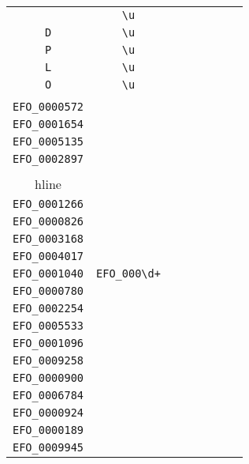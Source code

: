 \begin{longtable}{cccccccc}
\begin{tabular}{ll}
    \verb|U| & \verb|\u|\\
\verb|D| & \verb|\u|\\
\verb|P| & \verb|\u|\\
\verb|L| & \verb|\u|\\
\verb|O| & \verb|\u|
\end{tabular}
\\\midrule 
\begin{tabular}{l}
    \verb|EFO_0001656|\\
\verb|EFO_0000572|\\
\verb|EFO_0001654|\\
\verb|EFO_0005135|\\
\verb|EFO_0002897|\\
\\hline\\
\verb|EFO_0001266|\\
\verb|EFO_0000826|\\
\verb|EFO_0003168|\\
\verb|EFO_0004017|\\
\verb|EFO_0001040|
\end{tabular}

&
\verb|EFO_000\d+|
&

\begin{tabular}{l}
    \verb|EFO_000\d\d\d\d|\\
\verb|EFO_0000780|\\
\verb|EFO_0002254|\\
\verb|EFO_0005533|\\
\verb|EFO_0001096|\\
\verb|EFO_0009258|
\end{tabular}

&

\begin{tabular}{l}
    \verb|EFO_000\d\d\d\d|\\
\verb|EFO_0000900|\\
\verb|EFO_0006784|\\
\verb|EFO_0000924|\\
\verb|EFO_0000189|\\
\verb|EFO_0009945|
\end{tabular}

&


\end{longtable}
